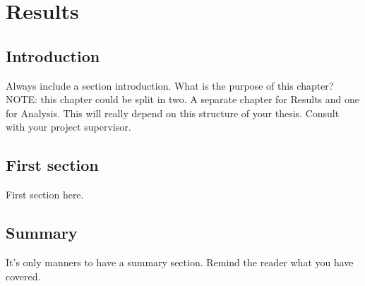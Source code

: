 \chapter{Results} \label{chapter:results}

\section{Introduction}\label{sec:results-intro}
Always include a section introduction. What is the purpose of this chapter?  NOTE: this chapter could be split in two. A separate chapter for Results and one for Analysis. This will really depend on this structure of your thesis. Consult with your project supervisor.

\section{First section}\label{sec:results-first-section}
First section here.

\section{Summary}\label{sec:results-summary}
It's only manners to have a summary section. Remind the reader what you have covered. 